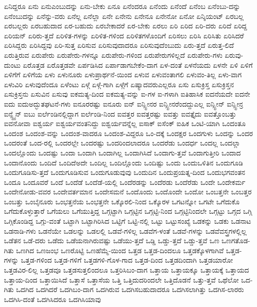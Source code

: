 {ಏನಿದ್ದರೂ
ಏನು
ಏನುಎಂಬುದನ್ನು
ಏನು-ಬೇಕು
ಏನೂ
ಏನೆಂದರೂ
ಏನೆಂದು
ಏನೆಂದೆ
ಏನೆಂಬ
ಏನೆಂಬು-ದನ್ನು
ಏನೆಂಬುದನ್ನು
ಏನೆನ್ನು-ವರು
ಏನೆಲ್ಲ
ಏನೆಲ್ಲಾ
ಏನೇ
ಏನೇನು
ಏನೇನೂ
ಏನೇನೋ
ಏನೋ
ಏನ್ಶಿಯಂಟ್
ಏರಬಲ್ಲ
ಏರಬಲ್ಲರು
ಏರಬಹುದಾದ
ಏರ-ಬಹುದು
ಏರಬೇಕಾದರೆ
ಏರ-ಬೇಕು
ಏರಲು
ಏರಿ
ಏರಿದ
ಏರಿ-ದರು
ಏರಿದೆ
ಏರಿದ್ದ
ಏರಿಯನ್
ಏರಿರು-ತ್ತದೆ
ಏರಿಳಿತ-ಗಳನ್ನು
ಏರಿಳಿತ-ಗಳಿಂದ
ಏರಿಳಿತಗಳೊಂದಿಗೆ
ಏರಿಸಲು
ಏರಿಸಿ
ಏರಿಸಿತು
ಏರಿಸಿದರೆ
ಏರಿಸಿದ್ದರು
ಏರಿಸಿದ್ದವು
ಏರಿ-ಸುತ್ತ
ಏರಿಸುವ
ಏರಿಸುವುದಾದರೂ
ಏರಿಸುವುದೆಂಬುದು
ಏರು-ತ್ತದೆ
ಏರುತ್ತ-ಲಿದೆ
ಏರುತ್ತಿರುವ
ಏರುಪೇರು
ಏರುಪೇರು-ಗಳನ್ನೂ
ಏರುಪೇರು-ಗಳಿಂದ
ಏರುಪೇರುಗಳಿಲ್ಲದೆ
ಏರುಪೇರು-ಗಳು
ಏರುವು-ದುಂಟು
ಏರೊತ್ತಡ
ಏರೊತ್ತಡವೇ
ಏರ್ಪಡಿಸಿದ
ಏರ್ಪಾಡಾಗಬೇಕೆಂ-ದಾಗ
ಏಳ-ದಂತೆ
ಏಳನೆಯದು
ಏಳನೇ
ಏಳಿ
ಏಳಿಗೆ
ಏಳಿಗೆಗೆ
ಏಳಿಗೆಯ
ಏಳು
ಏಳುನೂರು
ಏಳುಪ್ರಾರ್ಥನೆ-ಯಿಂದ
ಏಳುವ
ಏಳುವಂತಾಗಲಿ
ಏಳುವಂ-ತಿಲ್ಲ
ಏಳು-ವಾಗ
ಏಳುವಿರಿ
ಏಳುವುದೆಂದೂ
ಏಳೆಂಟು
ಏಳ್ಗೆ
ಏಳ್ಗೆ-ಗಾಗಿ
ಏಳ್ಗೆಗೆ
ಏಷ್ಯಾದವರುಎಲ್ಲರೂ
ಏಸು
ಏಸುಕ್ರಿಸ್ತ
ಏಸುಕ್ರಿಸ್ತನ
ಏಸುಕ್ರಿಸ್ತನು
ಏಸುವಿನ
ಏಸುವು
ಐಕಮತ್ಯ-ದಿಂದ
ಐಕಮತ್ಯ-ವನ್ನು
ಐ-ಗಳ
ಐ-ಗಳಾಗಿ
ಐತಿಹಾಸಿಕ
ಐದನೆಯದೇ
ಐದನೇ
ಐದು
ಐದುಅದ್ಭುತಘಟನೆ-ಗಳು
ಐನೂರರಷ್ಟು
ಐನೂರು
ಐನ್
ಐನ್ಸ್ಟೀನರ
ಐನ್ಸ್ಟೀನರೆಂದದ್ದುಎಲ್ಲ
ಐನ್ಸ್ಟೀನ್
ಐನ್ಸ್ಟೀನ್ರ
ಐನ್ಸ್ಟೈನ್
ಐಬು
ಐರ್ಲೆಂಡಿನಲ್ಲಿದ್ದಾಗ
ಐರ್ಲೆಂಡಿ-ನಿಂದ
ಐವತ್ತರ
ಐವತ್ತರಷ್ಟು
ಐವತ್ತು
ಐವತ್ತೈದು
ಐವತ್ತೊಂಬತ್ತು
ಐವನೋವಾ
ಐಶ್ವರ್ಯ
ಐಶ್ವರ್ಯವಂತನಿದ್ದು
ಐಶ್ವರ್ಯವನ್ನೆಲ್ಲ
ಐಸಾಕ್
ಐಸೆಂಕ್
ಐಹಿಕ
ಒಂಟಿ-ಯಾಗಿ
ಒಂದಂತೂ
ಒಂದಂಶ
ಒಂದಂಶ-ವನ್ನು
ಒಂದಂಶ-ವಾದರೂ
ಒಂದಂಶ-ವಿದ್ದರೂ
ಒಂ-ದಕ್ಕೆ
ಒಂದಕ್ಷರ
ಒಂದಗುಳು
ಒಂದನ್ನು
ಒಂದರ
ಒಂದರಂತೆ
ಒಂದ-ರಲ್ಲಿ
ಒಂದರಲ್ಲೇ
ಒಂದರಷ್ಟು
ಒಂದರಿಂದಲಾದರೂ
ಒಂದರೆಡು
ಒಂದರ್ಧ
ಒಂದಲ್ಲ
ಒಂದಲ್ಲಾ
ಒಂದಲ್ಲೊಂದು
ಒಂದಷ್ಟು
ಒಂದಾ
ಒಂದಾಗಿ
ಒಂದಾಗಿಲ್ಲ
ಒಂದಾಗಿಸಿದೆ
ಒಂದಾಗು-ತ್ತವೆ
ಒಂದಾಗುತ್ತೀರಿ
ಒಂದಾದ
ಒಂದಾನೊಂದು
ಒಂದಿದೆ
ಒಂದಿದೆಅದೇ
ಒಂದಿಲ್ಲ
ಒಂದಿಲ್ಲೊಂದು
ಒಂದಿಷ್ಟು
ಒಂದು
ಒಂದುಒಳಿತಿನ
ಒಂದುಗೂಡಿ
ಒಂದುಗೂಡಿಸು-ತ್ತದೆ
ಒಂದುಗೂಡಿಸುವ
ಒಂದುಗೂಡುವುವು
ಒಂದುದಿನ
ಒಂದುಪ್ರಯತ್ನ-ದಿಂದ
ಒಂದುಭಗವಂತನ
ಒಂದೂ
ಒಂದೂವರೆ
ಒಂದೆ
ಒಂದೆಡೆ
ಒಂದೆಡೆ-ಯಲ್ಲಿ
ಒಂದೆರಡನ್ನು
ಒಂದೆರಡು
ಒಂದೆರೆಡು
ಒಂದೇ
ಒಂದೇಕರ್ಮ
ಒಂದೇನೋಡು-ವವರ
ಒಂದೇವರ್ತಮಾನ
ಒಂದೇಸಮನೆ
ಒಂದೊಂದು
ಒಂದೊಂದೇ
ಒಂದೋ
ಒಂಬತ್ತನೇ
ಒಂಬತ್ತರ
ಒಂಬತ್ತು
ಒಂಬೈನೂರು
ಒಂಭತ್ತನೆಯ
ಒಂಭತ್ತನೇ
ಒಕ್ಕೊರಲಿ-ನಿಂದ
ಒಕ್ಕೊರಳ
ಒಗಟನ್ನೋ
ಒಗಟೇ
ಒಗೆದುಕೊ
ಒಗೆದುಕೊಳ್ಳುತ್ತಾರೆ
ಒಗೆಯಲು
ಒಗೆಯುತ್ತಿದ್ದ
ಒಗ್ಗಟ್ಟಾಗಿ
ಒಗ್ಗಟ್ಟಿನ
ಒಗ್ಗಟ್ಟಿ-ನಿಂದ
ಒಗ್ಗಟ್ಟಿನಿಂದಲೇ
ಒಗ್ಗಟ್ಟು
ಒಗ್ಗದ
ಒಗ್ಗಿ
ಒಗ್ಗಿಕೊಂಡಿದ್ದ
ಒಗ್ಗು-ವಂತೆ
ಒಟ್ಟಾಗಿ
ಒಟ್ಟಾಗಿರಿಸಿದ
ಒಟ್ಟಿಗೆ
ಒಟ್ಟಿ-ನಲ್ಲಿ
ಒಟ್ಟು
ಒಟ್ಟುಸಂಖ್ಯೆ
ಒಡಕನ್ನು
ಒಡಕು
ಒಡನಾಟ
ಒಡನಾಡಿ-ಗಳು
ಒಡನೆಯೇ
ಒಡಲನ್ನು
ಒಡಲಲ್ಲಿ
ಒಡವೆ-ಗಳಿಲ್ಲ
ಒಡವೆಗ-ಳಂತೆ
ಒಡವೆ-ಗಳನ್ನು
ಒಡವೆವಸ್ತ್ರಗಳಲ್ಲಿಲ್ಲ
ಒಡೆತನ
ಒಡೆ-ದರು
ಒಡೆದು
ಒಡೆಯನಾಗಿರುವಷ್ಟು
ಒಡೆಯು-ತ್ತದೆ
ಒಡ್ಡಿ
ಒಡ್ಡು-ತ್ತದೆ
ಒಡ್ಡು-ತ್ತವೆ
ಒಣ
ಒಣಗತೊಡ-ಗಿತು
ಒಣಗಿದ
ಒಣಜಂಭ
ಒಣರೊಟ್ಟಿ
ಒಣಹೆಮ್ಮೆ-ಯಿಂದ
ಒತ್ತಡ
ಒತ್ತಡ-ದಿಂದಲೂ
ಒತ್ತಡಕ್ಕೊಳಗಾಗಿವೆ
ಒತ್ತಡ-ಗಳನ್ನು
ಒತ್ತಡ-ಗಳಿಂದ
ಒತ್ತಡ-ಗಳಿಗೆ
ಒತ್ತಡಗಳಿ-ಗೊಳ-ಗಾದ
ಒತ್ತಡ-ದಿಂದ
ಒತ್ತಡದಿಂದಾಗಿ
ಒತ್ತಡಯಾರೋ
ಒತ್ತಡವಿರ-ಲಿಲ್ಲ
ಒತ್ತಡವೂ
ಒತ್ತಡಸುತ್ತಲಿಂದಲೂ
ಒತ್ತರಿಸಿಬಂ-ದಾಗ
ಒತ್ತಾಯ
ಒತ್ತಾಯಕ್ಕೂ
ಒತ್ತಾಯಕ್ಕೆ
ಒತ್ತಾಯದ
ಒತ್ತಾಯ-ದಿಂದ
ಒತ್ತಾಯಿಸಿದೆ
ಒತ್ತಾಸೆ
ಒತ್ತಾಸೆಯ
ಒತ್ತಿ
ಒತ್ತಿದುದರಿಂದಲೇ
ಒತ್ತಿದೊಡನೆ
ಒತ್ತು-ತ್ತವೆ
ಒಥೆಲೋ
ಒದ-ಗಿತು
ಒದಗಿದ
ಒದಗಿದರೆ
ಒದಗಿಬಂ-ದಾಗ
ಒದಗಿರುವ
ಒದಗಿಸಬಹುದಾದರೂ
ಒದಗಿಸಲಾಗಿತ್ತು
ಒದಗಿಸ-ಲಾರರು
ಒದಗಿಸಿ-ದಂತೆ
ಒದಗಿಸಿದರೂ
ಒದಗಿಸಿಯಾವು
}
